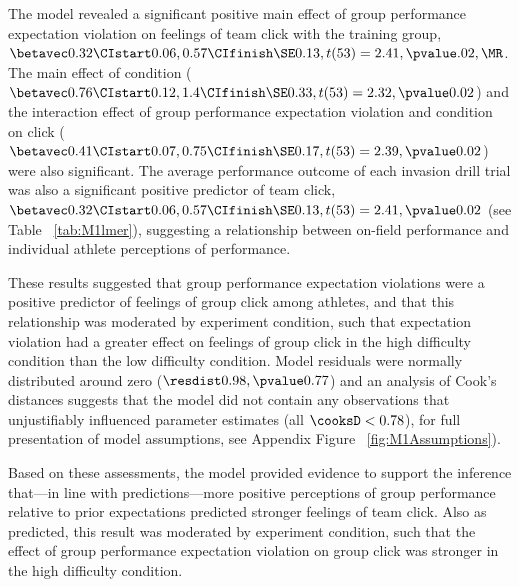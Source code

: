 The model revealed a significant positive main effect of group performance expectation violation on feelings of team click with the training group,  $\betavec 0.32 \CIstart 0.06, 0.57 \CIfinish \SE 0.13, t(53)= 2.41,\pvalue .02, \MR $.
The main effect of condition ( $\betavec 0.76 \CIstart 0.12, 1.4 \CIfinish \SE 0.33, t(53) = 2.32, \pvalue 0.02 $)
and the interaction effect of group performance expectation violation and condition on click ( $\betavec 0.41 \CIstart 0.07, 0.75 \CIfinish \SE 0.17, t(53) = 2.39, \pvalue 0.02 $) were also significant.  The average performance outcome of each invasion drill trial was also a significant positive predictor of team click,  $\betavec 0.32 \CIstart 0.06, 0.57 \CIfinish \SE 0.13, t(53)= 2.41, \pvalue 0.02$ (see Table ~\ref{tab:M1lmer}), suggesting a relationship between on-field performance and individual athlete perceptions of performance.

These results suggested that group performance expectation violations were a positive predictor of feelings of group click among athletes, and that this relationship was moderated by experiment condition, such that expectation violation had a greater effect on feelings of group click in the high difficulty condition than the low difficulty condition.  Model residuals were normally distributed around zero
($\resdist 0.98, \pvalue 0.77 $) and an analysis of Cook's distances suggests that the model did not contain any observations that unjustifiably influenced parameter estimates (all   $\cooksD < 0.78$), for full presentation of model assumptions, see Appendix Figure ~\ref{fig:M1Assumptions}).

Based on these assessments, the model provided evidence to support the inference that---in line with predictions---more positive perceptions of group performance relative to prior expectations predicted stronger feelings of team click. Also as predicted, this result was moderated by experiment condition, such that the effect of group performance expectation violation on group click was stronger in the high difficulty condition.




